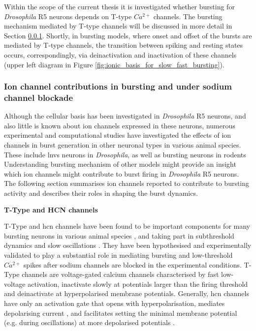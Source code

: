 \documentclass[../main.tex]{subfiles}
\begin{document}
Within the scope of the current thesis it is investigated whether bursting for \textit{Drosophila} R5 neurons depends on T-type $Ca^{2+}$ channels. The bursting mechanism mediated by T-type channels will be discussed in more detail in Section \ref{subsubsec:ion_channel_contributions}. Shortly, in bursting models, where onset and offset of the bursts are mediated by T-type channels, the transition between spiking and resting states occurs, correspondingly, via deinactivation and inactivation of these channels (upper left diagram in Figure \ref{fig:ionic_basis_for_slow_fast_bursting}).


\subsubsection{Ion channel contributions in bursting and under sodium channel blockade} \label{subsubsec:ion_channel_contributions}

Although the cellular basis has been investigated in \textit{Drosophila} R5 neurons, and also little is known about ion channels expressed in these neurons, numerous experimental and computational studies have investigated the effects of ion channels in burst generation in other neuronal types in various animal species. These include \glspl{lnv} neurons in \textit{Drosophila}, as well as bursting neurons in rodents \cite{vickstromTTypeCalciumChannels2020,golombContributionPersistentNa2006,liuMultipleConductancesCooperatively2008,wangMultipleDynamicalModes1994,mccormickModelElectrophysiologicalProperties1992} Understanding bursting mechanism of other models might provide an insight which ion channels might contribute to burst firing in \textit{Drosophila} R5 neurons. The following section summarises ion channels reported to contribute to bursting activity and describes their roles in shaping the burst dynamics.

\noindent\textbf{T-Type and HCN channels}

T-Type and \gls{hcn} channels have been found to be important components for many bursting neurons in various animal species \cite{amarilloInterplaySevenSubthreshold2014,vickstromTTypeCalciumChannels2020,destexheModelInwardCurrent1993},
and taking part in subthreshold dynamics and slow oscillations \cite{wangMultipleDynamicalModes1994}.
They have been hypothesised and experimentally validated to play a substantial role in mediating bursting and low-threshold $Ca^{2+}$ spikes after sodium channels are blocked in the experimental conditions.
T-Type channels are voltage-gated calcium channels characterised by fast low-voltage activation, inactivate slowly at potentials larger than the firing threshold and deinactivate at hyperpolarised membrane potentials. Generally, \gls{hcn} channels have only an activation gate that opens with hyperpolarisation, mediates depolarising current \cite{destexheModelInwardCurrent1993}, and facilitates setting the minimal membrane potential (e.g. during oscillations) at more depolarised potentials \cite{liuMultipleConductancesCooperatively2008}.
\end{document}
